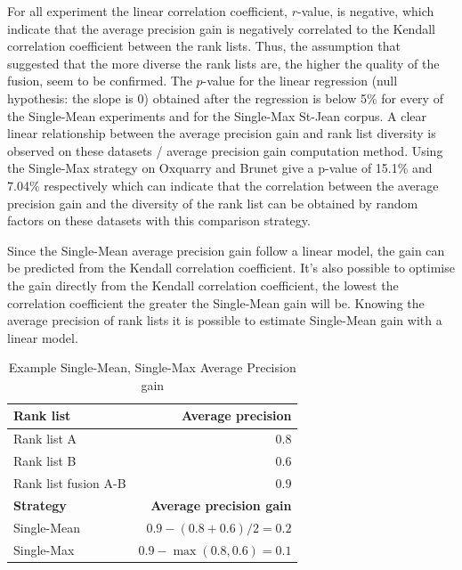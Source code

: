 For all experiment the linear correlation coefficient, $r$-value, is negative, which indicate that the average precision gain is negatively correlated to the Kendall correlation coefficient between the rank lists.
Thus, the assumption that suggested that the more diverse the rank lists are, the higher the quality of the fusion, seem to be confirmed.
The $p$-value for the linear regression (null hypothesis: the slope is 0) obtained after the regression is below 5\% for every of the Single-Mean experiments and for the Single-Max St-Jean corpus.
A clear linear relationship between the average precision gain and rank list diversity is observed on these datasets / average precision gain computation method.
Using the Single-Max strategy on Oxquarry and Brunet give a p-value of 15.1\% and 7.04\% respectively which can indicate that the correlation between the average precision gain and the diversity of the rank list can be obtained by random factors on these datasets with this comparison strategy.

Since the Single-Mean average precision gain follow a linear model, the gain can be predicted from the Kendall correlation coefficient. It's also possible to optimise the gain directly from the Kendall correlation coefficient, the lowest the correlation coefficient the greater the Single-Mean gain will be.
Knowing the average precision of rank lists it is possible to estimate Single-Mean gain with a linear model.

\begin{table}
  \centering
  \caption{Example Single-Mean, Single-Max Average Precision gain}
  \label{tab:example_single_mean_single_max}
  \begin{tabular}{l r}
    \toprule
    \textbf{Rank list} & \textbf{Average precision} \\
    \midrule
    Rank list A & $0.8$ \\
    Rank list B & $0.6$ \\
    Rank list fusion A-B & $0.9$ \\
    \midrule
    \textbf{Strategy} & \textbf{Average precision gain} \\
    Single-Mean & $0.9 - (0.8 + 0.6) / 2 = 0.2$ \\
    Single-Max & $0.9 - \max(0.8, 0.6) = 0.1$ \\
    \bottomrule
  \end{tabular}
\end{table}

